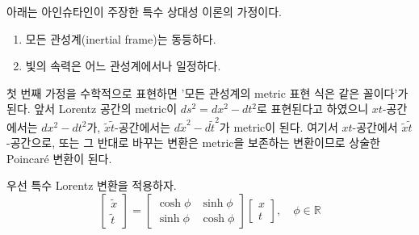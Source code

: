 \documentclass[10pt,a4paper]{article}
\begin{document}
아래는 아인슈타인이 주장한 특수 상대성 이론의 가정이다.
\begin{tcolorbox}[title=특수 상대성 이론에서의 가정\null]
\begin{enumerate}
    \item 모든 관성계(inertial frame)는 동등하다.
    \item 빛의 속력은 어느 관성계에서나 일정하다.
\end{enumerate}
\end{tcolorbox}
첫 번째 가정을 수학적으로 표현하면 '모든 관성계의 metric 표현 식은 같은 꼴이다'가 된다. 앞서 Lorentz 공간의 metric이 $ds^2 = dx^2 - dt^2$로 표현된다고 하였으니 $xt$-공간에서는 $dx^2 - dt^2$가, $\tilde{x}\tilde{t}$-공간에서는 $d\tilde{x}^2 - d\tilde{t}^2$가 metric이 된다. 여기서 $xt$-공간에서 $\tilde{x}\tilde{t}$-공간으로, 또는 그 반대로 바꾸는 변환은 metric을 보존하는 변환이므로 상술한 Poincaré 변환이 된다.

우선 특수 Lorentz 변환을 적용하자.
\[
    \begin{bmatrix}
        \tilde{x}\\\tilde{t}
    \end{bmatrix} = 
    \begin{bmatrix}
        \cosh{\phi} & \sinh{\phi}\\
        \sinh{\phi} & \cosh{\phi}
    \end{bmatrix}
    \begin{bmatrix}
        x \\ t
    \end{bmatrix}, \quad \phi \in \mathbb{R}
\]
\end{document}
